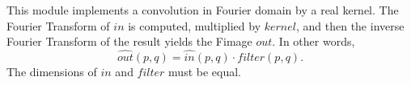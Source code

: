 This module implements a convolution in Fourier domain by
a real kernel. The Fourier Transform of $in$ is computed,
multiplied by $kernel$, and then the inverse Fourier Transform
of the result yields the Fimage $out$. In other words,
$$\widehat{out}(p,q) = \widehat{in}(p,q) \cdot filter(p,q).$$
The dimensions of $in$ and $filter$ must be equal.
